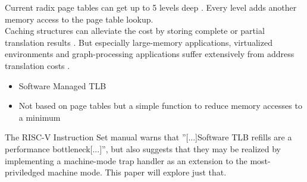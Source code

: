 Current radix page tables can get up to 5 levels deep \cite{intel5LevelPaging5Level2017}. Every level
adds another memory access to the page table lookup.\\
Caching structures can alleviate the cost by storing complete or partial translation results \cite{van2002memory}.
But especially large-memory applications, virtualized environments and graph-processing applications
suffer extensively from address translation costs \cite{zagieboylo2020cost}.









\begin{itemize}
    \item Software Managed TLB
    \item Not based on page tables but a simple function to reduce memory accesses to a minimum
\end{itemize}


The RISC-V Instruction Set manual warns that ''[...]Software TLB refills are a performance bottleneck[...]''\cite{RISCVInstructionSet},
but also suggests that they may be realized by implementing a machine-mode trap handler as an extension to the
most-priviledged machine mode. This paper will explore just that.




